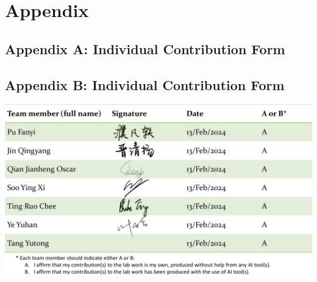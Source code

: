 
\chapter*{Appendix}

\section*{Appendix A: Individual Contribution Form}

\begin{center}
\end{center}

\section*{Appendix B: Individual Contribution Form}

\includegraphics[width=\textwidth]{appendix/AI.pdf}